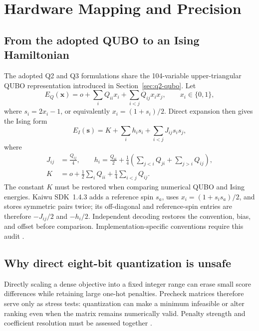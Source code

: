 \section{Hardware Mapping and Precision}
\label{sec:hardware-precision}

\subsection{From the adopted QUBO to an Ising Hamiltonian}

The adopted Q2 and Q3 formulations share the 104-variable
upper-triangular QUBO representation introduced in
Section~\ref{sec:q2-qubo}.  Let
\begin{equation}
 E_Q(\bm{x})=o+\sum_i Q_{ii}x_i+\sum_{i<j}Q_{ij}x_ix_j,
 \qquad x_i\in\{0,1\},
 \label{eq:hardware-qubo}
\end{equation}
where $s_i=2x_i-1$, or equivalently $x_i=(1+s_i)/2$.  Direct expansion
then gives the Ising form
\begin{equation}
 E_I(\bm{s})=K+\sum_i h_i s_i+\sum_{i<j}J_{ij}s_is_j,
 \label{eq:ising-hamiltonian}
\end{equation}
where
\begin{align}
 J_{ij}&=\frac{Q_{ij}}{4},\qquad
 h_i=\frac{Q_{ii}}{2}+\frac14\left(\sum_{j<i}Q_{ji}+\sum_{j>i}Q_{ij}\right),
 \label{eq:qubo-ising-coefficients}\\
 K&=o+\frac12\sum_iQ_{ii}+\frac14\sum_{i<j}Q_{ij}.
 \label{eq:qubo-ising-constant}
\end{align}
The constant $K$ must be restored when comparing numerical QUBO and Ising
energies.  Kaiwu SDK~1.4.3 adds a reference spin $s_a$, uses
$x_i=(1+s_is_a)/2$, and stores symmetric pairs twice; its off-diagonal and
reference-spin entries are therefore $-J_{ij}/2$ and $-h_i/2$.  Independent
decoding restores the convention, bias, and offset before comparison.
Implementation-specific conventions require this audit
\cite{Lucas2014IsingNP,Glover2019QUBOTutorial}.

\subsection{Why direct eight-bit quantization is unsafe}

Directly scaling a dense objective into a fixed integer range can erase
small score differences while retaining large one-hot penalties.  Precheck
matrices therefore serve only as stress tests: quantization can make a
minimum infeasible or alter ranking even when the matrix remains numerically
valid.  Penalty strength and coefficient resolution must be assessed together
\cite{Ceselli2023GoodQUBOEncodings,Muecke2025OptimumPreservingQUBO,Ohno2026PrecisionErrorsQA}.

